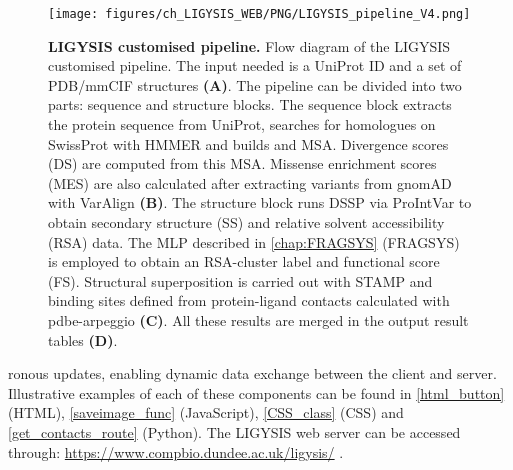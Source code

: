 \begin{figure}[htbp!]
    \centering
    \texttt{[image: figures/ch\_LIGYSIS\_WEB/PNG/LIGYSIS\_pipeline\_V4.png]}
    \caption[LIGYSIS customised pipeline]{\textbf{LIGYSIS customised pipeline.} Flow diagram of the LIGYSIS customised pipeline. The input needed is a UniProt ID and a set of PDB/mmCIF structures \textbf{(A)}. The pipeline can be divided into two parts: sequence and structure blocks. The sequence block extracts the protein sequence from UniProt, searches for homologues on SwissProt with HMMER and builds and MSA. Divergence scores (DS) are computed from this MSA. Missense enrichment scores (MES) are also calculated after extracting variants from gnomAD with VarAlign \textbf{(B)}. The structure block runs DSSP via ProIntVar to obtain secondary structure (SS) and relative solvent accessibility (RSA) data. The MLP described in \autoref{chap:FRAGSYS} (FRAGSYS) is employed to obtain an RSA-cluster label and functional score (FS). Structural superposition is carried out with STAMP and binding sites defined from protein-ligand contacts calculated with pdbe-arpeggio \textbf{(C)}. All these results are merged in the output result tables \textbf{(D)}.}
    \label{fig:ligysis_pipeline}
\end{figure}

\noindent
ronous updates, enabling dynamic data exchange between the client and server. Illustrative examples of each of these components can be found in \autoref{html_button} (HTML), \autoref{saveimage_func} (JavaScript), \autoref{CSS_class} (CSS) and \autoref{get_contacts_route} (Python). The LIGYSIS web server can be accessed through: \url{https://www.compbio.dundee.ac.uk/ligysis/} \cite{LIGYSIS_SERVER}.

\lstset{style=mystyle}

